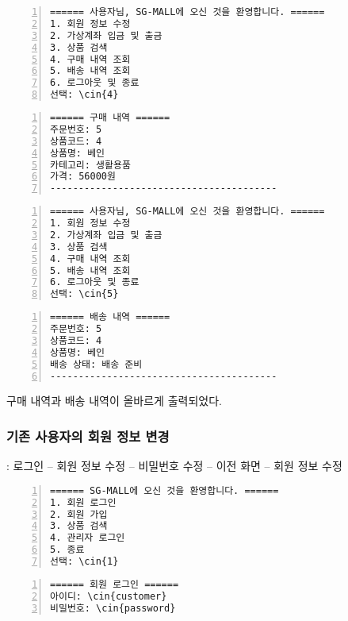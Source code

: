 \documentclass[runningheads]{llncs}
\newcommand{\cin}[1]{\textbf{\textcolor{orange}{#1}}}
\begin{document}
\begin{Verbatim}[frame=single,numbers=left,commandchars=\\\{\}]
====== 사용자님, SG-MALL에 오신 것을 환영합니다. ======
1. 회원 정보 수정
2. 가상계좌 입금 및 출금
3. 상품 검색
4. 구매 내역 조회
5. 배송 내역 조회
6. 로그아웃 및 종료
선택: \cin{4}
\end{Verbatim}

\begin{Verbatim}[frame=single,numbers=left,commandchars=\\\{\}]
====== 구매 내역 ======
주문번호: 5
상품코드: 4
상품명: 베인
카테고리: 생활용품
가격: 56000원
----------------------------------------
\end{Verbatim}

\begin{Verbatim}[frame=single,numbers=left,commandchars=\\\{\}]
====== 사용자님, SG-MALL에 오신 것을 환영합니다. ======
1. 회원 정보 수정
2. 가상계좌 입금 및 출금
3. 상품 검색
4. 구매 내역 조회
5. 배송 내역 조회
6. 로그아웃 및 종료
선택: \cin{5}
\end{Verbatim}

\begin{Verbatim}[frame=single,numbers=left,commandchars=\\\{\}]
====== 배송 내역 ======
주문번호: 5
상품코드: 4
상품명: 베인
배송 상태: 배송 준비
----------------------------------------
\end{Verbatim}

구매 내역과 배송 내역이 올바르게 출력되었다. 

\subsubsection{기존 사용자의 회원 정보 변경}: 로그인 -- 회원 정보 수정 -- 비밀번호 수정 -- 이전 화면 -- 회원 정보 수정

\begin{Verbatim}[frame=single,numbers=left,commandchars=\\\{\}]
====== SG-MALL에 오신 것을 환영합니다. ======
1. 회원 로그인
2. 회원 가입
3. 상품 검색
4. 관리자 로그인
5. 종료
선택: \cin{1}
\end{Verbatim}

\begin{Verbatim}[frame=single,numbers=left,commandchars=\\\{\}]
====== 회원 로그인 ======
아이디: \cin{customer}
비밀번호: \cin{password}
\end{Verbatim}
\end{document}
